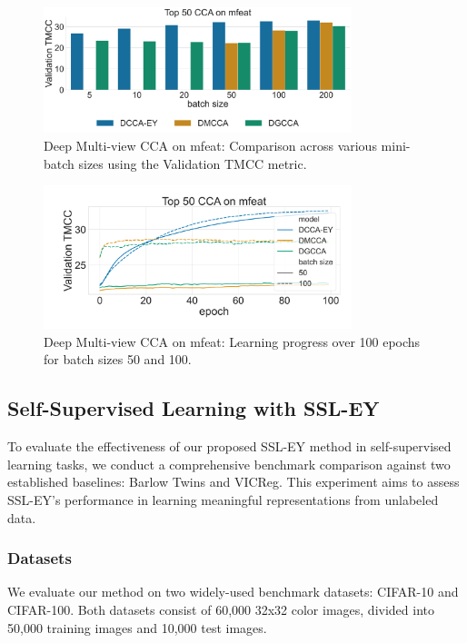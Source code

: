 \begin{figure}
    \centering
    \includegraphics[width=0.8\textwidth]{figures/DMCCA/mfeat_models_different_batch_sizes}
    \caption{Deep Multi-view CCA on mfeat: Comparison across various mini-batch sizes using the Validation TMCC metric.}\label{fig:dmcca_corr}
\end{figure}

\begin{figure}
    \centering
    \includegraphics[width=0.8\textwidth]{figures/DMCCA/mfeat_allbatchsizes_pcc}
    \caption{Deep Multi-view CCA on mfeat: Learning progress over 100 epochs for batch sizes 50 and 100.}\label{fig:dmcca_lr}
\end{figure}

\subsection{Self-Supervised Learning with SSL-EY}

To evaluate the effectiveness of our proposed SSL-EY method in self-supervised learning tasks, we conduct a comprehensive benchmark comparison against two established baselines: Barlow Twins and VICReg. This experiment aims to assess SSL-EY's performance in learning meaningful representations from unlabeled data.

\subsubsection{Datasets}

We evaluate our method on two widely-used benchmark datasets: CIFAR-10 and CIFAR-100. Both datasets consist of 60,000 32x32 color images, divided into 50,000 training images and 10,000 test images.

